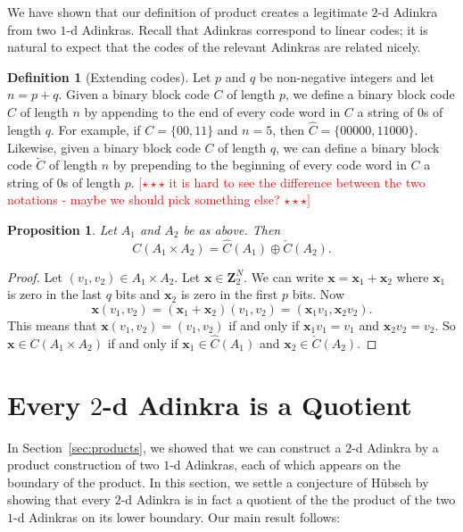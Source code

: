 \documentclass[12pt,twoside,singlespace]{article}
\numberwithin{equation}{section}
\newtheorem{prop}[equation]{Proposition}
\theoremstyle{definition}
\newtheorem{definition}[equation]{Definition}
\newcommand{\ZZ}{\mathbf{Z}}
\newcommand{\com}[1]{\textcolor{red}{$[\star \star \star$ #1 $\star \star \star]$}}
\renewcommand{\vec}[1]{\mathbf{#1}}
\begin{document}
We have shown that our definition of product creates a legitimate $2$-d Adinkra from two $1$-d Adinkras. Recall that Adinkras correspond to linear codes; it is natural to expect that the codes of the relevant Adinkras are related nicely.

\begin{definition}[Extending codes]
Let $p$ and $q$ be non-negative integers and let $n=p+q$. Given a binary block code $C$ of length $p$, we define a binary block code $\hat{C}$ of length $n$ by appending to the end of every code word in $C$ a string of $0$s of length $q$. For example, if $C = \{00, 11\}$ and $n = 5$, then $\hat{C} = \{00000, 11000\}$. Likewise, given a binary block code $C$ of length $q$, we can define a binary block code $\check{C}$ of length $n$ by prepending to the beginning of every code word in $C$ a string of $0$s of length $p$. \com{it is hard to see the difference between the two notations - maybe we should pick something else?}
\end{definition}

\begin{prop}
Let $A_1$ and $A_2$ be as above.  Then
\[C(A_1\times A_2)=\hat{C}(A_1)\oplus \check{C}(A_2).\]
\end{prop}
\begin{proof}
Let $(v_1,v_2)\in A_1\times A_2$.  Let $\vec{x}\in \ZZ_2^N$.  We can write $\vec{x}=\vec{x}_1+\vec{x}_2$ where $\vec{x}_1$ is zero in the last $q$ bits and $\vec{x}_2$ is zero in the first $p$ bits.  Now
\[\vec{x}(v_1,v_2)=(\vec{x}_1+\vec{x}_2)(v_1,v_2)=(\vec{x}_1v_1,\vec{x}_2v_2).\]
This means that $\vec{x}(v_1,v_2)=(v_1,v_2)$ if and only if $\vec{x}_1v_1=v_1$ and $\vec{x}_2 v_2=v_2$. So $\vec{x}\in C(A_1\times A_2)$ if and only if $\vec{x}_1\in \hat{C}(A_1)$ and $\vec{x}_2\in \check{C}(A_2)$.
\end{proof}





\section{Every $2$-d Adinkra is a Quotient}
\label{sec:quotient}

In Section~\ref{sec:products}, we showed that we can construct a $2$-d Adinkra by a product construction of two $1$-d Adinkras, each of which appears on the boundary of the product. In this section, we settle a conjecture of H\"ubsch \cite{hubsch:weaving} by showing that every $2$-d Adinkra is in fact a quotient of the the product of the two $1$-d Adinkras on its lower boundary. Our main result follows:
\end{document}
